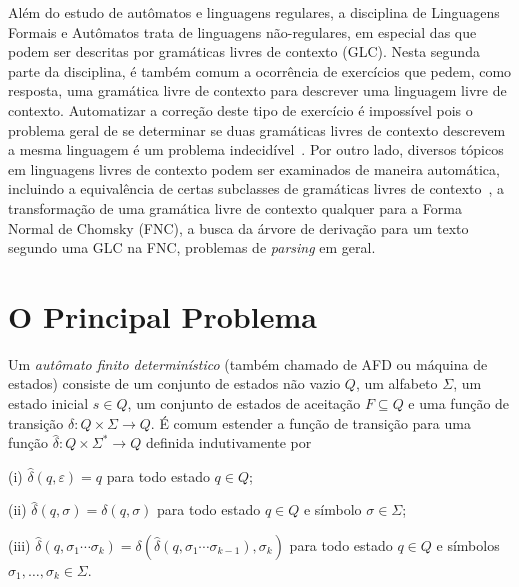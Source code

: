\documentclass[
	12pt,				%
	openany,
	oneside,
	a4paper,			%
	english,			%
	brazil				%
	]{abntex2}
\begin{document}
  Além do estudo de autômatos e linguagens regulares, a disciplina de Linguagens Formais e Autômatos trata de linguagens não-regulares, em especial das que podem ser descritas por gramáticas livres de contexto (GLC). Nesta segunda parte da disciplina, é também comum a ocorrência de exercícios que pedem, como resposta, uma gramática livre de contexto para descrever uma linguagem livre de contexto.  Automatizar a correção deste tipo de exercício é impossível pois o problema geral de se determinar se duas gramáticas livres de contexto descrevem a mesma linguagem é um problema indecidível~\cite{sipser}. Por outro lado, diversos tópicos em linguagens livres de contexto podem ser examinados de maneira automática, incluindo a equivalência de certas subclasses de gramáticas livres de contexto~\cite{nijholt}, a transformação de uma gramática livre de contexto qualquer para a Forma Normal de Chomsky (FNC), a busca da árvore de derivação para um texto segundo uma GLC na FNC, problemas de \emph{parsing} em geral.



  \clearpage
\chapter[O Principal Problema]{O Principal Problema}

  Um \emph{autômato finito determinístico} (também chamado de AFD ou máquina de estados) consiste de um conjunto de estados não vazio $Q$, um alfabeto $\Sigma$, um estado inicial $s \in Q$, um conjunto de estados de aceitação $F \subseteq Q$ e uma função de transição $\delta \colon Q \times \Sigma \rightarrow Q$. É comum estender a função de transição para uma função $\hat{\delta} \colon Q \times \Sigma^* \rightarrow Q$ definida indutivamente por
  \begin{alineas}%
    \item[(i)] $\hat{\delta}(q, \varepsilon) = q$ para todo estado $q \in Q$;
    \item[(ii)] $\hat{\delta}(q, \sigma) = \delta(q, \sigma)$ para todo estado $q \in Q$ e símbolo $\sigma \in \Sigma$;
    \item[(iii)] $\hat{\delta}(q, \sigma_1 \cdots \sigma_k) = \delta(\hat{\delta}(q, \sigma_1 \cdots \sigma_{k-1}), \sigma_k)$ para todo estado $q \in Q$ e símbolos $\sigma_1, \dots, \sigma_k \in \Sigma$.
  \end{alineas}
\end{document}
